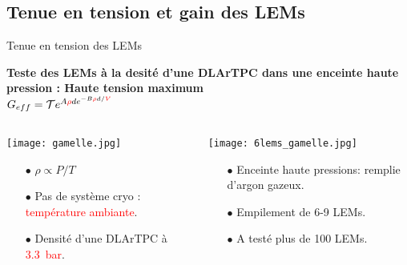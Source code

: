    \subsection[Tension et gain]{Tenue en tension et gain des LEMs}

    \begin{frame}{Tenue en tension des LEMs}
    	\begin{scriptsize}
    		\begin{center}
    			\textbf{Teste des LEMs à la desité d'une DLArTPC dans une enceinte haute pression : Haute tension maximum}\\
    			$G _{eff}= \mathcal{T}e^{A\textcolor{red}{\rho} d e^{-B\textcolor{red}{\rho}d/\textcolor{red}{V}}}$
    		\end{center} 
    		\begin{columns}
		    	\begin{column}{0.5\textwidth}
		    		\texttt{[image: gamelle.jpg]}\\
		    		\begin{itemize}
		    			\item[$\bullet$] $\rho \propto P/T$
		    			\item[$\bullet$] Pas de système cryo : \textcolor{red}{température ambiante}.
		    			\item[$\bullet$] Densité d'une DLArTPC à \textcolor{red}{\SI{3.3}{\bar}}.
		    		\end{itemize}
		    	\end{column}\hfill
		    	\begin{column}{0.5\textwidth}
		    		\texttt{[image: 6lems\_gamelle.jpg]}\\
		    		\begin{itemize}
		    			\item[$\bullet$] Enceinte haute pressions: remplie d'argon gazeux.
		    			\item[$\bullet$] Empilement de 6-9 LEMs.
		    			\item[$\bullet$] A testé plus de 100 LEMs.
		    		\end{itemize}
		    	\end{column}
		    \end{columns}
	    \end{scriptsize} 
    \end{frame}

